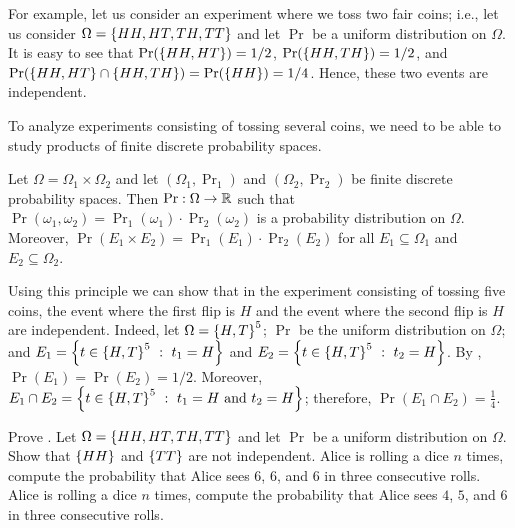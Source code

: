 For example, let us consider an experiment where we toss two fair coins; i.e.,
let us consider $\Omega = \set{HH, HT, TH, TT}$ and let $\Pr$ be a uniform
distribution on $\Omega$. It is easy to see that $\Pr(\set{HH, HT}) = 1 / 2$,
$\Pr(\set{HH, TH}) = 1 / 2$, and $\Pr(\set{HH, HT} \cap \set{HH, TH}) =
\Pr(\set{HH}) =  1 / 4$. Hence, these two events are independent.

To analyze experiments consisting of tossing several coins, we need to be able
to study products of finite discrete probability spaces.
\begin{theorem}
\label{theorem:multiplicative-principle-probability}
  Let $\Omega = \Omega_1 \times \Omega_2$ and let $(\Omega_1, \Pr_1)$ and
  $(\Omega_2, \Pr_2)$ be finite discrete probability spaces. Then $\Pr : \Omega
  \to {\mathbb{R}}$ such that $\Pr(\omega_1, \omega_2) = \Pr_1(\omega_1) \cdot
  \Pr_2(\omega_2)$ is a probability distribution on $\Omega$.
  Moreover, $\Pr(E_1 \times E_2) = \Pr_1(E_1) \cdot \Pr_2(E_2)$ for all 
  $E_1 \subseteq \Omega_1$ and $E_2 \subseteq \Omega_2$.
\end{theorem}

Using this principle we can show that in the experiment consisting of tossing
five coins, the event where the first flip is $H$ and the event where the second
flip is $H$ are independent. Indeed, let $\Omega = \set{H, T}^5$; 
$\Pr$ be the uniform distribution on $\Omega$; and 
$E_1 = \set[t_1 = H]{t \in \set{H, T}^5}$ and
$E_2 = \set[t_2 = H]{t \in \set{H, T}^5}$. By
,
$\Pr(E_1) = \Pr(E_2) = 1 / 2$. Moreover, 
$E_1 \cap E_2 = \set[t_1 = H \text{ and } t_2 = H]{t \in \set{H, T}^5}$;
therefore, $\Pr(E_1 \cap E_2) = \frac{1}{4}$.

\begin{chapterendexercises}
  \exercise Prove .
  \exercise Let $\Omega = \set{HH, HT, TH, TT}$ and let $\Pr$ be a uniform
    distribution on $\Omega$. Show that $\set{HH}$ and $\set{TT}$ are not
    independent.
  \exercise Alice is rolling a dice $n$ times, compute the probability
    that Alice sees $6$, $6$, and $6$ in three consecutive rolls.
  \exercise Alice is rolling a dice $n$ times, compute the probability
    that Alice sees $4$, $5$, and $6$ in three consecutive rolls.
\end{chapterendexercises}
